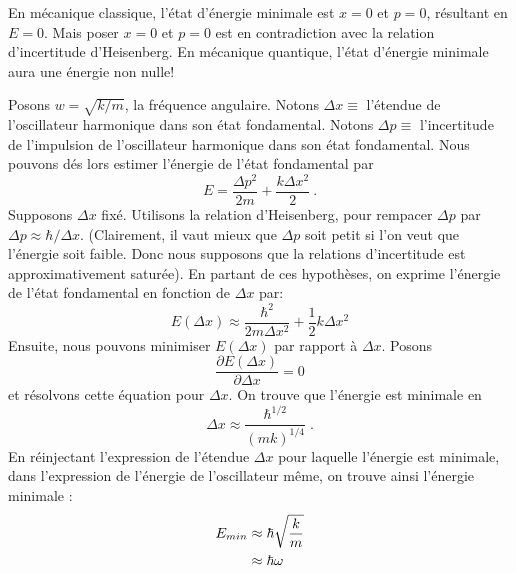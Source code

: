 \documentclass{book}
\begin{document}
En mécanique classique, l'état d'énergie minimale est $x=0$ et $p=0$, résultant en $E=0$. Mais poser $x=0$ et $p=0$ est en contradiction avec la relation d'incertitude d'Heisenberg. En mécanique quantique, l'état d'énergie minimale aura une énergie non nulle!

Posons $w = \sqrt{k/m}$, la fréquence angulaire. 
\newline Notons $\Delta x \equiv$ l'étendue de l'oscillateur harmonique dans son état fondamental. 
\newline Notons $\Delta p \equiv$ l'incertitude de l'impulsion de l'oscillateur harmonique dans son état fondamental. 
\newline Nous pouvons dés lors estimer l'énergie de l'état fondamental par
\begin{equation}
    \label{Energie OHC}
    E = \frac{\Delta p^2}{2m} + \frac{k \Delta x^2}{2}\ .
\end{equation}
\newline Supposons $\Delta x$ fixé. Utilisons la relation d'Heisenberg, pour rempacer  $\Delta p$ par $\Delta p \approx \hbar/\Delta x$. (Clairement, il vaut mieux que $\Delta p$ soit petit si l'on veut que l'énergie soit faible. Donc nous supposons que la relations d'incertitude est approximativement saturée).
\newline En partant de ces hypothèses, on exprime l'énergie de l'état fondamental en fonction de $\Delta x$ par: 
\begin{equation}
E \left(\Delta x \right) \approx \frac{\hbar^2}{2m\Delta x^2} + \frac{1}{2} k \Delta x^2
\end{equation}
\newline  Ensuite, nous pouvons minimiser $E \left(\Delta x \right) $ par rapport à $\Delta x$. Posons
\begin{equation}
\frac{ \partial E \left(\Delta x \right) }{\partial \Delta x} =0
\end{equation}
et résolvons cette équation pour $\Delta x$.
On trouve que l'énergie est minimale en $$\Delta x \approx \frac{\hbar^{1/2}}{\left(mk\right)^{1/4}}\; .$$ 
En réinjectant l'expression de l'étendue $\Delta x$ pour laquelle l'énergie est minimale, dans l'expression de l'énergie de l'oscillateur même, on trouve ainsi l'énergie minimale : 
\begin{align}
\label{Energie OH}
E_{min} &\approx \hbar \sqrt{\frac{k}{m}} \notag \\
& \approx \hbar \omega 
\end{align}
\end{document}
